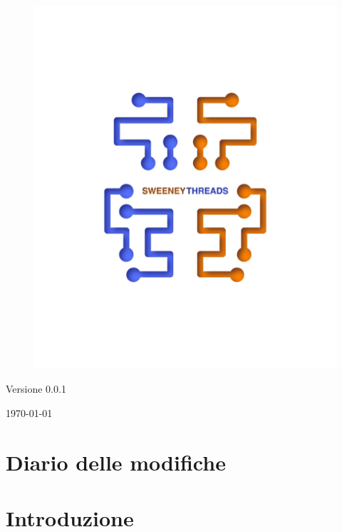 \documentclass[a4paper]{article}
\begin{document}
\begin{titlepage}
		\begin{figure}[H]
			\centering
			\includegraphics[scale=0.8]{sweeney.png}
		\end{figure}
		\begin{center}
			Versione 0.0.1
		\end{center}
		{\large \today} \\ [3cm] 
		\vfill  
	\end{titlepage}
	
	
	\tableofcontents
	
	\newpage 
	\section*{Diario delle modifiche}

	\newpage \section{Introduzione}
\end{document}
